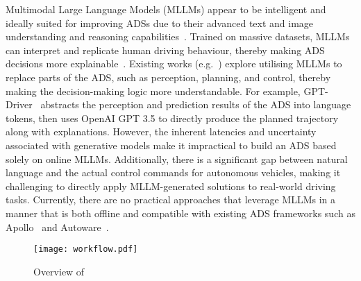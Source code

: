 Multimodal Large Language Models (MLLMs) appear to be intelligent and ideally suited for improving ADSs due to their advanced text and image understanding and reasoning capabilities~\cite{brown2020language, achiam2023gpt, yin2023survey}. Trained on massive datasets, MLLMs can interpret and replicate human driving behaviour, thereby making ADS decisions more explainable~\cite{cui2024survey}.
Existing works (e.g.~\cite{chen2023driving, mao2023gpt, wen2024road}) explore utilising MLLMs to replace parts of the ADS, such as perception, planning, and control, thereby making the decision-making logic more understandable. For example, GPT-Driver~\cite{mao2023gpt} abstracts the perception and prediction results of the ADS into language tokens, then uses OpenAI GPT 3.5 to directly produce the planned trajectory along with explanations.
However, the inherent latencies and uncertainty associated with generative models make it impractical to build an ADS based solely on online MLLMs.
Additionally, there is a significant gap between natural language and the actual control commands for autonomous vehicles, making it challenging to directly apply MLLM-generated solutions to real-world driving tasks.
Currently, there are no practical approaches that leverage MLLMs in a manner that is both offline and compatible with existing ADS frameworks such as Apollo~\cite{apolloauto} and Autoware~\cite{autoware}.




\begin{figure}
    \centering
    \texttt{[image: workflow.pdf]}
    \vspace{-0.4cm}
    \caption{Overview of \coolname}
    \label{fig:overflow}
    \vspace{-0.6cm}
\end{figure}

